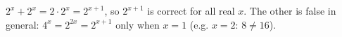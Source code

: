 $2^x+2^x=2\cdot2^x=2^{x+1}$, so $\boxed{2^{x+1}}$ is correct for all real $x$. The other is false in general: $4^x=2^{2x}=2^{x+1}$ only when $x=1$ (e.g. $x=2$: $8\ne16$).

